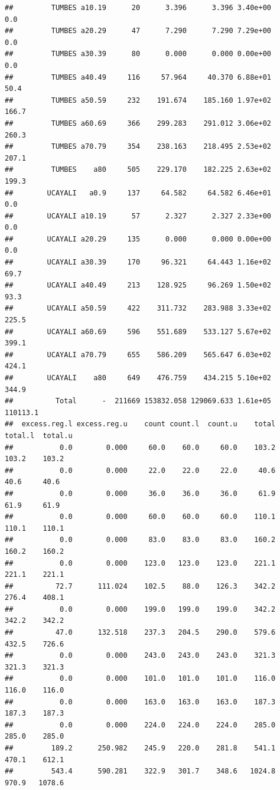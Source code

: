 \documentclass[
]{article}
\begin{document}
\begin{verbatim}
##         TUMBES a10.19      20      3.396      3.396 3.40e+00        0.0
##         TUMBES a20.29      47      7.290      7.290 7.29e+00        0.0
##         TUMBES a30.39      80      0.000      0.000 0.00e+00        0.0
##         TUMBES a40.49     116     57.964     40.370 6.88e+01       50.4
##         TUMBES a50.59     232    191.674    185.160 1.97e+02      166.7
##         TUMBES a60.69     366    299.283    291.012 3.06e+02      260.3
##         TUMBES a70.79     354    238.163    218.495 2.53e+02      207.1
##         TUMBES    a80     505    229.170    182.225 2.63e+02      199.3
##        UCAYALI   a0.9     137     64.582     64.582 6.46e+01        0.0
##        UCAYALI a10.19      57      2.327      2.327 2.33e+00        0.0
##        UCAYALI a20.29     135      0.000      0.000 0.00e+00        0.0
##        UCAYALI a30.39     170     96.321     64.443 1.16e+02       69.7
##        UCAYALI a40.49     213    128.925     96.269 1.50e+02       93.3
##        UCAYALI a50.59     422    311.732    283.988 3.33e+02      225.5
##        UCAYALI a60.69     596    551.689    533.127 5.67e+02      399.1
##        UCAYALI a70.79     655    586.209    565.647 6.03e+02      424.1
##        UCAYALI    a80     649    476.759    434.215 5.10e+02      344.9
##          Total      -  211669 153832.058 129069.633 1.61e+05   110113.1
##  excess.reg.l excess.reg.u    count count.l  count.u    total  total.l  total.u
##           0.0        0.000     60.0    60.0     60.0    103.2    103.2    103.2
##           0.0        0.000     22.0    22.0     22.0     40.6     40.6     40.6
##           0.0        0.000     36.0    36.0     36.0     61.9     61.9     61.9
##           0.0        0.000     60.0    60.0     60.0    110.1    110.1    110.1
##           0.0        0.000     83.0    83.0     83.0    160.2    160.2    160.2
##           0.0        0.000    123.0   123.0    123.0    221.1    221.1    221.1
##          72.7      111.024    102.5    88.0    126.3    342.2    276.4    408.1
##           0.0        0.000    199.0   199.0    199.0    342.2    342.2    342.2
##          47.0      132.518    237.3   204.5    290.0    579.6    432.5    726.6
##           0.0        0.000    243.0   243.0    243.0    321.3    321.3    321.3
##           0.0        0.000    101.0   101.0    101.0    116.0    116.0    116.0
##           0.0        0.000    163.0   163.0    163.0    187.3    187.3    187.3
##           0.0        0.000    224.0   224.0    224.0    285.0    285.0    285.0
##         189.2      250.982    245.9   220.0    281.8    541.1    470.1    612.1
##         543.4      590.281    322.9   301.7    348.6   1024.8    970.9   1078.6

\end{verbatim}
\end{document}
